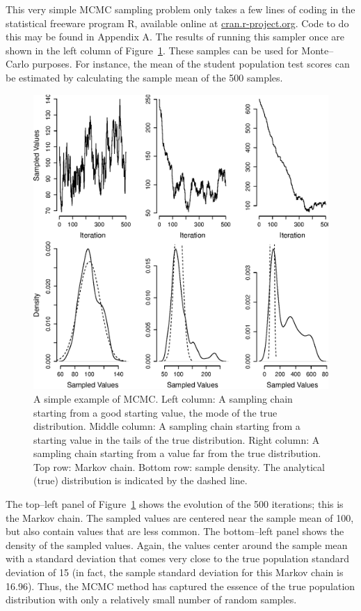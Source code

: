 This very simple MCMC sampling problem only takes a few lines of coding in the statistical freeware program R, available online at \url{cran.r-project.org}. Code to do this may be found in Appendix A. The results of running this sampler once are shown in the left column of Figure~\ref{SimpleExample}. These samples can be used for Monte--Carlo purposes. For instance, the mean of the student population test scores can be estimated by calculating the sample mean of the 500 samples.

\begin{figure}[!t]
    \begin{center}
        \includegraphics[width=\textwidth]{figs/don_SimpleExample2.eps}
        \caption{A simple example of MCMC. Left column: A sampling chain starting from a good starting value, the mode of the true distribution. Middle column: A sampling chain starting from a starting value in the tails of the true distribution. Right column: A sampling chain starting from a value far from the true distribution. Top row: Markov chain. Bottom row: sample density. The analytical (true) distribution is indicated by the dashed line.}
        \label{SimpleExample}
    \end{center}
\end{figure}

The top--left panel of Figure~\ref{SimpleExample} shows the evolution of the 500 iterations; this is the Markov chain. The sampled values are centered near the sample mean of 100, but also contain values that are less common. The bottom--left panel shows the density of the sampled values. Again, the values center around the sample mean with a standard deviation that comes very close to the true population standard deviation of 15 (in fact, the sample standard deviation for this Markov chain is 16.96). Thus, the MCMC method has captured the essence of the true population distribution with only a relatively small number of random samples.

